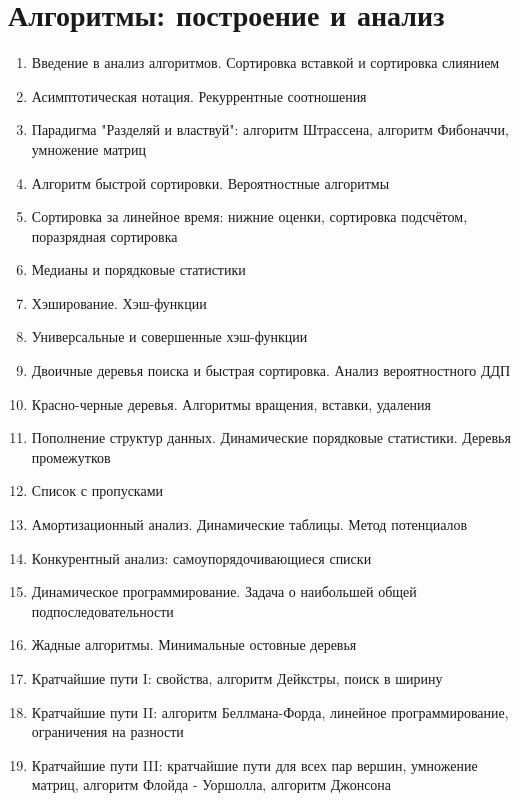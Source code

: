 \documentclass[a4paper,10pt]{article}
\begin{document}
\section*{Алгоритмы: построение и анализ}
\begin{enumerate}
\item
Введение в анализ алгоритмов. Сортировка вставкой и сортировка слиянием
\item
Асимптотическая нотация. Рекуррентные соотношения
\item
Парадигма "Разделяй и властвуй": алгоритм Штрассена, алгоритм Фибоначчи, умножение матриц 
\item
Алгоритм быстрой сортировки. Вероятностные алгоритмы
\item
Сортировка за линейное время: нижние оценки, сортировка подсчётом, поразрядная сортировка
\item
Медианы и порядковые статистики
\item
Хэширование. Хэш-функции
\item
Универсальные и совершенные хэш-функции
\item
Двоичные деревья поиска и быстрая сортировка. Анализ вероятностного ДДП
\item
Красно-черные деревья. Алгоритмы вращения, вставки, удаления
\item
Пополнение структур данных. Динамические порядковые статистики. Деревья промежутков
\item
Список с пропусками
\item
Амортизационный анализ. Динамические таблицы. Метод потенциалов
\item
Конкурентный анализ: самоупорядочивающиеся списки
\item
Динамическое программирование. Задача о наибольшей общей подпоследовательности
\item
Жадные алгоритмы. Минимальные остовные деревья
\item
Кратчайшие пути I: свойства, алгоритм Дейкстры, поиск в ширину
\item
Кратчайшие пути II: алгоритм Беллмана-Форда, линейное программирование, ограничения на разности
\item
Кратчайшие пути III: кратчайшие пути для всех пар вершин, умножение матриц, алгоритм Флойда - Уоршолла, алгоритм Джонсона
\end{enumerate}
\end{document}
